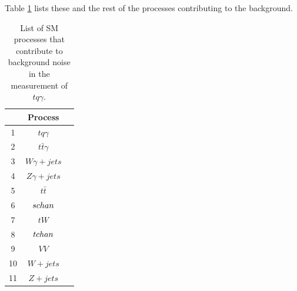 Table \ref{tab:background} lists these and the rest of the processes contributing to the background.
\begin{table}
    \centering
    \begin{tabular}{c c c}
        \toprule
        {} & Process \\
        \midrule
        1 & $tq\gamma$\\[.1cm]
        2 & $t\bar{t}\gamma$\\[.1cm]
        3 & $W\gamma + jets$\\[.1cm]
        4 & $Z\gamma + jets$\\[.1cm]
        5 & $t\bar{t}$\\[.1cm]
        6 & $s\-chan$\\[.1cm]
        7 & $t W$\\[.1cm]
        8 & $t\-chan$\\[.1cm]
        9 & $VV$\\[.1cm]
        10& $W+jets$\\[.1cm]
        11& $Z+jets$\\[.1cm]
        \bottomrule
    \end{tabular}
    \caption{List of SM processes that contribute to background noise in the measurement of $tq\gamma$.}
    \label{tab:background}
\end{table}





